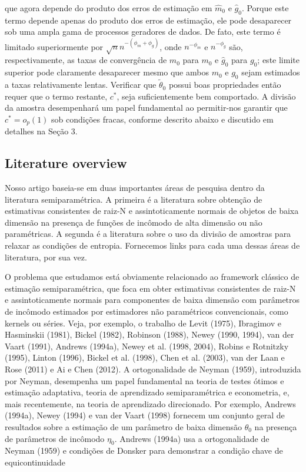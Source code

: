 \documentclass[a4paper,12pt]{article}[abntex2]
\begin{document}
que agora depende do produto dos erros de estimação em $\hat{m}_0$ e $\hat{g}_0$. Porque este termo depende apenas do produto dos erros de estimação, ele pode desaparecer sob uma ampla gama de processos geradores de dados. De fato, este termo é limitado superiormente por $\sqrt{n}n^{-(\phi_m + \phi_g)}$, onde $n^{-\phi_m}$ e $n^{-\phi_g}$ são, respectivamente, as taxas de convergência de $\hat{m}_0$ para $m_0$ e $\hat{g}_0$ para $g_0$; este limite superior pode claramente desaparecer mesmo que ambos $m_0$ e $g_0$ sejam estimados a taxas relativamente lentas. Verificar que $\tilde{\theta}_0$ possui boas propriedades então requer que o termo restante, $c^*$, seja suficientemente bem comportado. A divisão da amostra desempenhará um papel fundamental ao permitir-nos garantir que $c^* = o_p(1)$ sob condições fracas, conforme descrito abaixo e discutido em detalhes na Seção 3.

\subsection*{Literature  overview}

Nosso artigo baseia-se em duas importantes áreas de pesquisa dentro da literatura semiparamétrica. A primeira é a literatura sobre obtenção de estimativas consistentes de raiz-N e assintoticamente normais de objetos de baixa dimensão na presença de funções de incômodo de alta dimensão ou não paramétricas. A segunda é a literatura sobre o uso da divisão de amostras para relaxar as condições de entropia. Fornecemos links para cada uma dessas áreas de literatura, por sua vez.

O problema que estudamos está obviamente relacionado ao framework clássico de estimação semiparamétrica, que foca em obter estimativas consistentes de raiz-N e assintoticamente normais para componentes de baixa dimensão com parâmetros de incômodo estimados por estimadores não paramétricos convencionais, como kernels ou séries. Veja, por exemplo, o trabalho de Levit (1975), Ibragimov e Hasminskii (1981), Bickel (1982), Robinson (1988), Newey (1990, 1994), van der Vaart (1991), Andrews (1994a), Newey et al. (1998, 2004), Robins e Rotnitzky (1995), Linton (1996), Bickel et al. (1998), Chen et al. (2003), van der Laan e Rose (2011) e Ai e Chen (2012). A ortogonalidade de Neyman (1959), introduzida por Neyman, desempenha um papel fundamental na teoria de testes ótimos e estimação adaptativa, teoria de aprendizado semiparamétrica e econometria, e, mais recentemente, na teoria de aprendizado direcionado. Por exemplo, Andrews (1994a), Newey (1994) e van der Vaart (1998) fornecem um conjunto geral de resultados sobre a estimação de um parâmetro de baixa dimensão $\theta_0$ na presença de parâmetros de incômodo $\eta_0$. Andrews (1994a) usa a ortogonalidade de Neyman (1959) e condições de Donsker para demonstrar a condição chave de equicontinuidade
\end{document}
